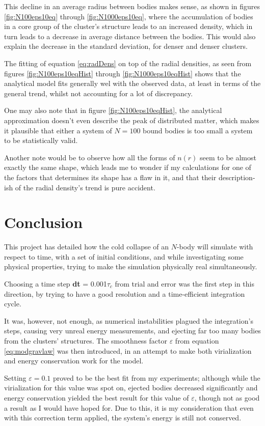\documentclass[11pt,a4paper,notitlepage,twocolumn]{article}
\begin{document}
This decline in an average radius between bodies makes sense, as shown in figures \ref{fig:N100eps10eq} through \ref{fig:N1000eps10eq}, where the accumulation of bodies in a core group of the cluster's structure leads to an increased density, which in turn leads to a decrease in average distance between the bodies. This would also explain the decrease in the standard deviation, for denser and denser clusters.

The fitting of equation \ref{eq:radDens} on top of the radial densities, as seen from figures \ref{fig:N100eps10eqHist} through \ref{fig:N1000eps10eqHist} shows that the analytical model fits generally wel with the observed data, at least in terms of the general trend, whilst not accounting for a lot of discrepancy.

One may also note that in figure \ref{fig:N100eps10eqHist}, the analytical approximation doesn't even describe the peak of distributed matter, which makes it plausible that either a system of $N=100$ bound bodies is too small a system to be statistically valid.

Another note would be to observe how all the forms of $n(r)$ seem to be almost exactly the same shape, which leads me to wonder if my calculations for one of the factors that determines its shape has a flaw in it, and that their description-ish of the radial density's trend is pure accident.

\section{Conclusion}
This project has detailed how the cold collapse of an $N$-body will simulate with respect to time, with a set of initial conditions, and while investigating some physical properties, trying to make the simulation physically real simultaneously.

Choosing a time step \textbf{dt} = 0.001$\tau_c$ from trial and error was the first step in this direction, by trying to have a good resolution and a time-efficient integration cycle.

It was, however, not enough, as numerical instabilities plagued the integration's steps, causing very unreal energy measurements, and ejecting far too many bodies from the clusters' structures. The smoothness factor $\varepsilon$ from equation \ref{eq:modgravlaw} was then introduced, in an attempt to make both virialization and energy conservation work for the model.

Setting $\varepsilon = 0.1$ proved to be the best fit from my experiments; although while the virialization for this value was spot on, ejected bodies decreased significantly and energy conservation yielded the best result for this value of $\varepsilon$, though not as good a result as I would have hoped for. Due to this, it is my consideration that even with this correction term applied, the system's energy is still not conserved.
\end{document}
